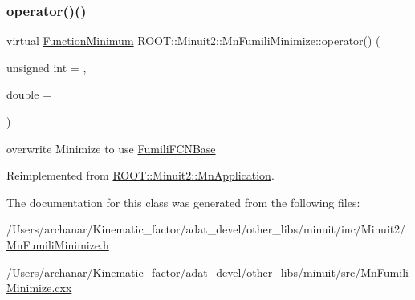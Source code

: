\subsubsection{\texorpdfstring{operator()()}{operator()()}\hspace{0.1cm}{\footnotesize\ttfamily [2/2]}}
{\footnotesize\ttfamily virtual \mbox{\hyperlink{classROOT_1_1Minuit2_1_1FunctionMinimum}{Function\+Minimum}} R\+O\+O\+T\+::\+Minuit2\+::\+Mn\+Fumili\+Minimize\+::operator() (\begin{DoxyParamCaption}\item[{unsigned int}]{ = {},  }\item[{double}]{ = {} }\end{DoxyParamCaption})\hspace{0.3cm}{\ttfamily [virtual]}}



overwrite Minimize to use \mbox{\hyperlink{classROOT_1_1Minuit2_1_1FumiliFCNBase}{Fumili\+F\+C\+N\+Base}} 



Reimplemented from \mbox{\hyperlink{classROOT_1_1Minuit2_1_1MnApplication_a8908d50d5d4f7f011b94bd10e51eacf7}{R\+O\+O\+T\+::\+Minuit2\+::\+Mn\+Application}}.



The documentation for this class was generated from the following files\+:\begin{DoxyCompactItemize}
\item 
/\+Users/archanar/\+Kinematic\+\_\+factor/adat\+\_\+devel/other\+\_\+libs/minuit/inc/\+Minuit2/\mbox{\hyperlink{other__libs_2minuit_2inc_2Minuit2_2MnFumiliMinimize_8h}{Mn\+Fumili\+Minimize.\+h}}\item 
/\+Users/archanar/\+Kinematic\+\_\+factor/adat\+\_\+devel/other\+\_\+libs/minuit/src/\mbox{\hyperlink{MnFumiliMinimize_8cxx}{Mn\+Fumili\+Minimize.\+cxx}}\end{DoxyCompactItemize}
